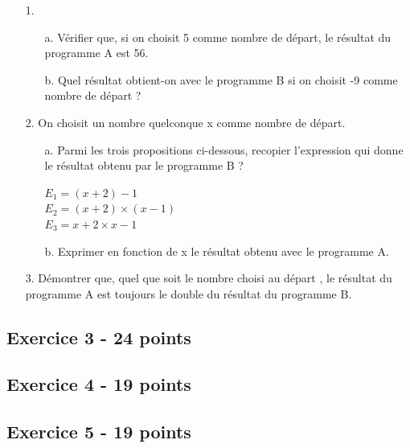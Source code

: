 \begin{enumerate}
  \item[1.] 
  \begin{enumerate}
    \item[a.] Vérifier que, si on choisit 5 comme nombre de départ, le résultat du programme A est 56.
    \item[b.] Quel résultat obtient-on avec le programme B si on choisit -9 comme nombre de départ ?
  \end{enumerate} 

  \item[2.] On choisit un nombre quelconque x comme nombre de départ.
  \begin{enumerate}
    \item[a.] Parmi les trois propositions ci-dessous, recopier l'expression qui donne le résultat obtenu par le programme B ?
      
    \begin{multicols}{3}\noindent
      $E_1 = (x+2)-1$ \\
      $E_2 = (x+2) \times (x - 1)$ \\
      $E_3 = x + 2 \times x - 1$ 
    \end{multicols}

    \item[b.] Exprimer en fonction de x le résultat obtenu avec le programme A.
  \end{enumerate} 

  \item[3.] Démontrer que, quel que soit le nombre choisi au départ , le résultat du programme A est toujours le double du résultat du programme B.
\end{enumerate}

\subsection*{Exercice 3 - 24 points }


\subsection*{Exercice 4 - 19 points }


\subsection*{Exercice 5 - 19 points }



